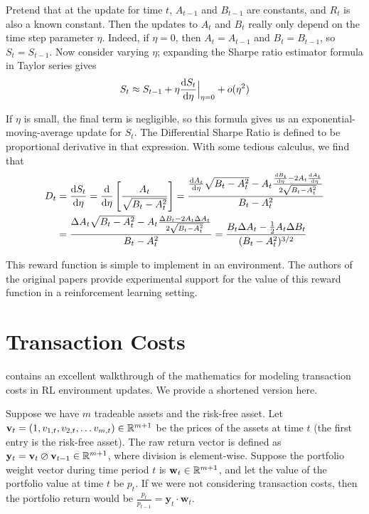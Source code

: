 Pretend that at the update for time $t$, $A_{t-1}$ and $B_{t-1}$ are constants,
and $R_t$ is also a known constant. Then the updates to $A_t$ and $B_t$ really only depend on the time step parameter $\eta$.
Indeed, if $\eta = 0$, then $A_t = A_{t-1}$ and $B_t = B_{t-1}$, so $S_t = S_{t-1}$.
Now consider varying $\eta$; expanding the Sharpe ratio estimator formula in Taylor series gives
\begin{align*}
  S_t \approx S_{t-1} + \eta \frac{\mathop{}\!\mathrm{d} S_t}{\mathop{}\!\mathrm{d} \eta}\Big|_{\eta = 0} + o(\eta^2)
\end{align*}

If $\eta$ is small, the final term is negligible, so this formula gives us an exponential-moving-average update for $S_t$.
The Differential Sharpe Ratio is defined to be proportional derivative in that expression. With some tedious calculus, we find that
\begin{align*}
  D_t &= \frac{\diff S_t}{\diff \eta} = \frac{\diff}{\diff\eta}\left[ \frac{A_t}{\sqrt{B_t - A_t^2}} \right] = \frac{\frac{\diff A_t}{\diff \eta} \sqrt{B_t - A_t^2} - A_t \frac{\frac{\diff B_t}{\diff \eta} - 2 A_t \frac{\diff A_t}{\diff \eta}}{2 \sqrt{B_t - A_t^2}}}{B_t - A_t^2} \\
  &= \frac{\Delta A_t \sqrt{B_t - A_t^2} - A_t \frac{\Delta B_t - 2 A_t \Delta A_t}{2 \sqrt{B_t - A_t^2}}}{B_t - A_t^2}
  = \frac{B_t \Delta A_t - \frac{1}{2} A_t \Delta B_t}{(B_t - A_t^2)^{3/2}}
\end{align*}

This reward function is simple to implement in an environment. The authors of the original papers provide
experimental support for the value of this reward function in a reinforcement learning setting.




\section{Transaction Costs}
\label{transaction_costs_section}

\cite{drl_framework} contains an excellent walkthrough of the mathematics for modeling transaction costs
in RL environment updates. We provide a shortened version here.

Suppose we have $m$ tradeable assets and the risk-free asset. Let $\mathbf v_t = (1, v_{1,t}, v_{2,t}, \ldots v_{m,t}) \in \mathbb{R}^{m+1}$ be the
prices of the assets at time $t$ (the first entry is the risk-free asset). The raw return vector is defined as
$\mathbf y_t = \mathbf v_t \varoslash \mathbf v_{t-1} \in \mathbb{R}^{m+1}$, where division is element-wise. Suppose the portfolio
weight vector during time period $t$ is $\mathbf w_t \in \mathbb{R}^{m+1}$, and let the value of the portfolio value at time $t$ be $p_t$.
If we were not considering transaction costs, then the portfolio return would be $\frac{p_t}{p_{t-1}} = \mathbf y_t \cdot \mathbf w_t$.

